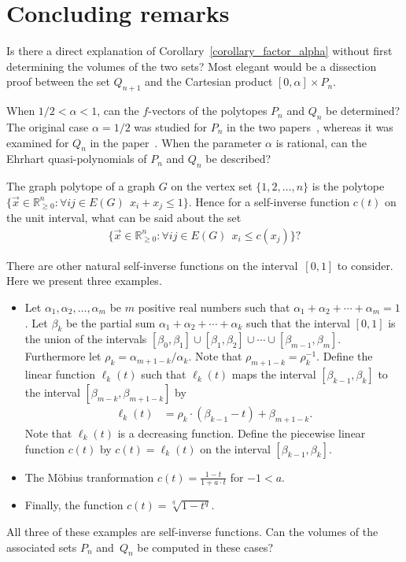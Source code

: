 \documentclass[11pt,reqno]{amsart}
\theoremstyle{definition}
\numberwithin{equation}{section}
\newcommand{\Rrr}{\mathbb{R}}
\begin{document}
\section{Concluding remarks}

Is there a direct explanation of Corollary~\ref{corollary_factor_alpha}
without first determining the volumes of the two sets?
Most elegant would be a dissection proof between the set
$Q_{n+1}$ and the Cartesian product $[0,\alpha] \times P_{n}$.

When $1/2 < \alpha < 1$, can the $f$-vectors 
of the polytopes $P_{n}$ and $Q_{n}$ be determined?
The original case $\alpha = 1/2$ was studied
for $P_{n}$ in
the two papers~\cite{Chebikin_Ehrenborg,Ehrenborg_Happ},
whereas it was examined for $Q_{n}$ in the paper~\cite{Ehrenborg_cycle}.
When the parameter $\alpha$ is rational,
can the Ehrhart quasi-polynomials 
of $P_{n}$ and $Q_{n}$ be described?

The graph polytope of a graph $G$ on the vertex set
$\{1,2, \ldots, n\}$ is the polytope
$\{\vec{x} \in \Rrr_{\geq 0}^{n} : \forall ij \in E(G) \:\: x_{i}+x_{j} \leq 1\}$.
Hence for a self-inverse function $c(t)$ on the unit interval, what can be said
about the set
\begin{align*}
\{\vec{x} \in \Rrr_{\geq 0}^{n} : \forall ij \in E(G) \:\: x_{i} \leq c(x_{j})\} ?
\end{align*}



There are other natural self-inverse functions on the interval~$[0,1]$
to consider. Here we present three examples.
\begin{itemize}
\item[(i)]
Let $\alpha_{1}, \alpha_{2}, \ldots, \alpha_{m}$ be
$m$ positive real numbers such that
$\alpha_{1} + \alpha_{2} + \cdots + \alpha_{m} = 1$.
Let $\beta_{k}$ be the partial sum
$\alpha_{1} + \alpha_{2} + \cdots + \alpha_{k}$
such that the interval $[0,1]$ is the union
of the intervals
$[\beta_{0},\beta_{1}] \cup [\beta_{1},\beta_{2}] \cup \cdots \cup
[\beta_{m-1},\beta_{m}]$.
Furthermore let $\rho_{k} = {\alpha_{m+1-k}}/{\alpha_{k}}$.
Note that $\rho_{m+1-k} = \rho_{k}^{-1}$.
Define the linear function $\ell_{k}(t)$
such that $\ell_{k}(t)$ maps the interval
$[\beta_{k-1},\beta_{k}]$
to the interval
$[\beta_{m-k},\beta_{m+1-k}]$
by
\begin{align*}
\ell_{k}(t)
& =
\rho_{k} \cdot (\beta_{k-1} - t) + \beta_{m+1-k} .
\end{align*}
Note that $\ell_{k}(t)$ is a decreasing function.
Define the piecewise linear function $c(t)$ by 
$c(t) = \ell_{k}(t)$ on the interval $[\beta_{k-1},\beta_{k}]$.

\item[(ii)]
The M\"obius tranformation
$c(t) = \frac{1 - t}{1 + a \cdot t}$
for $-1 < a$.

\item[(iii)]
Finally, the function $c(t) = \sqrt[q]{1 - t^{q}}$.
\end{itemize}
All three of these examples are self-inverse functions.
Can the volumes of the associated sets
$P_{n}$ and~$Q_{n}$ be computed in these cases?
\end{document}
